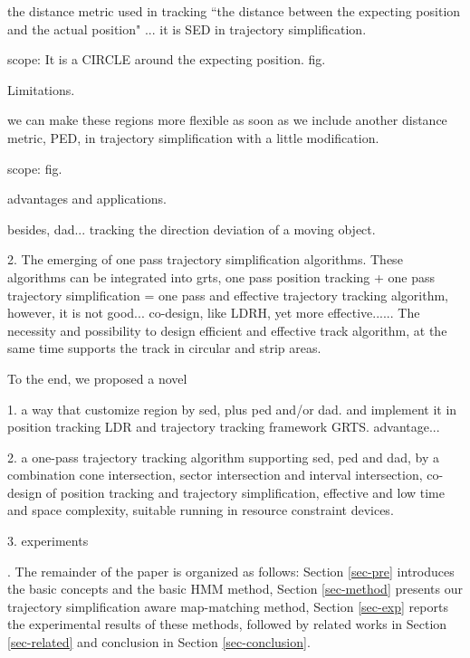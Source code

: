 the distance metric used in tracking ``the distance between the expecting position and the actual position" ... it is SED in trajectory simplification. 

scope: It is  a CIRCLE around the expecting position. fig.

Limitations.

we can make these regions more flexible as soon as we include another distance metric, PED, in trajectory simplification with a little modification.

scope: fig.

advantages and applications.

besides, dad... tracking the direction deviation of a moving object.


2. The emerging of one pass trajectory simplification algorithms. These algorithms can be integrated into grts, one pass position tracking + one pass trajectory simplification = one pass and effective trajectory tracking algorithm, however, it is not good... co-design, like LDRH, yet more effective...... 
The necessity and possibility to design efficient and effective track algorithm, at the same time supports the track in circular and strip areas.

To the end, we proposed a novel 

1. a way that customize region by sed, plus ped and/or dad. and implement it in position tracking LDR and trajectory tracking framework GRTS. advantage...

2. a one-pass trajectory tracking algorithm supporting sed, ped and dad, by a combination cone intersection, sector intersection and interval intersection, \ie co-design of position tracking and trajectory simplification, effective and low time and space complexity, suitable running in resource constraint devices.

3. experiments

.
The remainder of the paper is organized as follows:
Section \ref{sec-pre} introduces the basic concepts and the basic HMM method,
Section \ref{sec-method} presents our trajectory simplification aware map-matching method,
Section \ref{sec-exp} reports the experimental results of these methods, followed by related works in Section \ref{sec-related} and conclusion in Section \ref{sec-conclusion}.



